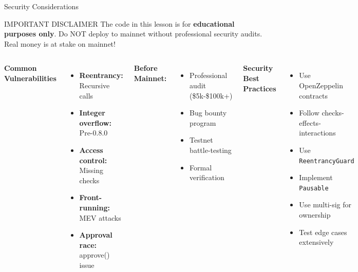 \documentclass[8pt,aspectratio=169]{beamer}
\begin{document}
\begin{frame}[t]{Security Considerations}
\begin{alertblock}{IMPORTANT DISCLAIMER}
The code in this lesson is for \textbf{educational purposes only}. Do NOT deploy to mainnet without professional security audits. Real money is at stake on mainnet!
\end{alertblock}

\vspace{0.3em}
\begin{columns}[T]
\textbf{Common Vulnerabilities}

\begin{itemize}
\item[\textcolor{mlred}{!}] \textbf{Reentrancy:} Recursive calls
\item[\textcolor{mlred}{!}] \textbf{Integer overflow:} Pre-0.8.0
\item[\textcolor{mlred}{!}] \textbf{Access control:} Missing checks
\item[\textcolor{mlred}{!}] \textbf{Front-running:} MEV attacks
\item[\textcolor{mlred}{!}] \textbf{Approval race:} approve() issue
\end{itemize}

\vspace{0.3em}
\textbf{Before Mainnet:}
\begin{itemize}
\item Professional audit (\$5k-\$100k+)
\item Bug bounty program
\item Testnet battle-testing
\item Formal verification
\end{itemize}

\textbf{Security Best Practices}

\begin{itemize}
\item[\textcolor{mlgreen}{$\checkmark$}] Use OpenZeppelin contracts
\item[\textcolor{mlgreen}{$\checkmark$}] Follow checks-effects-interactions
\item[\textcolor{mlgreen}{$\checkmark$}] Use \texttt{ReentrancyGuard}
\item[\textcolor{mlgreen}{$\checkmark$}] Implement \texttt{Pausable}
\item[\textcolor{mlgreen}{$\checkmark$}] Use multi-sig for ownership
\item[\textcolor{mlgreen}{$\checkmark$}] Test edge cases extensively
\end{itemize}


\end{columns}
\end{frame}
\end{document}
